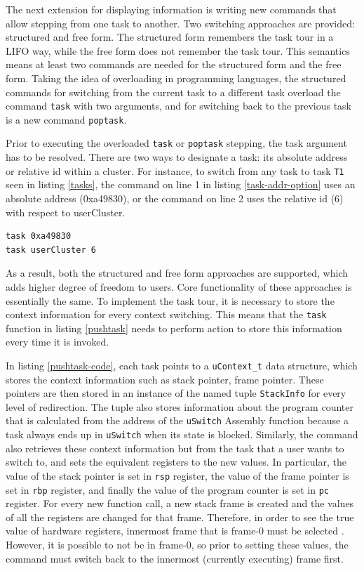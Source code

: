 The next extension for displaying information is writing new commands that allow
stepping from one \uCPPS task to another. Two switching approaches are
provided: structured and free form. The structured form remembers the task tour in a
LIFO way, while the free form does not remember the task tour. This semantics means
at least two commands are needed for the structured form and the free form.
Taking the idea of overloading in programming languages, the structured
commands for switching from the current task to a different task overload the
command \verb|task| with two  arguments, and
for switching back to the previous task is a new command \verb|poptask|.

Prior to executing the overloaded \verb|task| or \verb|poptask| stepping, the
task argument has to be resolved. There are two ways to designate a task: its
absolute address or relative id within a cluster. For instance, to switch from
any task to task \verb|T1| seen in listing \ref{tasks}, the command on line 1
in listing \ref{task-addr-option} uses an absolute address (0xa49830), or the
command on line 2 uses the relative id (6) with respect to userCluster.

\begin{lstlisting}[caption={task command option}, label={task-addr-option}]
task 0xa49830
task userCluster 6
\end{lstlisting}

As a result, both the structured and free form approaches are supported, which
adds higher degree of freedom to users. Core functionality of these approaches
is essentially the same. To implement the task tour, it is necessary
to store the context information for every context switching. This means that
the \verb|task| function in listing \ref{pushtask} needs to perform action to
store this information every time it is invoked.

In listing \ref{pushtask-code}, each task points to a \verb|uContext_t| data
structure, which stores the context
information such as stack pointer, frame pointer. These pointers are then
stored in an instance of the named tuple \verb|StackInfo| for every level of
redirection. The tuple also stores information about the program counter that
is calculated from the address of the \verb|uSwitch| Assembly function because a task always ends up in \verb|uSwitch| when its state is blocked. Similarly, the command
also retrieves these context information but from the task that a user wants to switch to, and
sets the equivalent registers to the new values. In particular, the value of the stack
pointer is set in \verb|rsp| register, the value of the frame pointer is set in \verb|rbp|
register, and finally the value of the program counter is set in \verb|pc| register.
For every new function call, a new stack frame is created and the values of all
the registers are changed for that frame. Therefore, in
order to see the true value of hardware registers, innermost frame that is
frame-0 must be selected \cite{reference11}. However, it is possible to not be in frame-0, so prior to setting these values,
the command must switch back to the innermost (currently executing) frame first.


